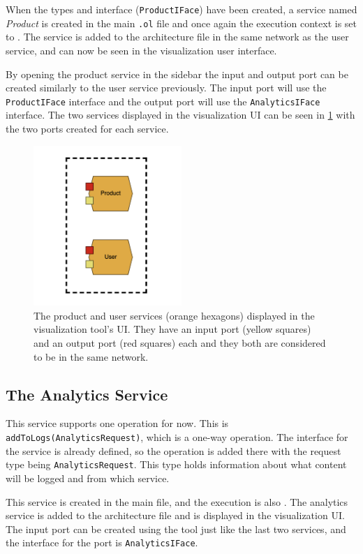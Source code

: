 When the types and interface (\texttt{ProductIFace}) have been created,
a service named \emph{Product} is created in the main \texttt{.ol} file and once again the execution context is set to .
The service is added to the architecture file in the same network as the user service, and can now be seen in the visualization user interface.

By opening the product service in the sidebar the input and output port can be created similarly to the user service previously. The input port will use the \texttt{ProductIFace} interface and the output port will use the \texttt{AnalyticsIFace} interface.
The two services displayed in the visualization UI can be seen in \cref{figure:jv_product_and_user} with the two ports created for each service.
\begin{figure}[t]
    \center
    \includegraphics[width=0.5\textwidth]{figures/jv_product_and_user.png}
    \caption{The product and user services (orange hexagons) displayed in the visualization tool's UI. They have an input port (yellow squares) and an output port (red squares) each and they both are considered to be in the same network.}
    \label{figure:jv_product_and_user}
\end{figure}

\subsection{The Analytics Service}
This service supports one operation for now. This is \texttt{addToLogs(AnalyticsRequest)}, which is a one-way operation. The interface for the service is already defined, so the operation is added there with the request type being \texttt{AnalyticsRequest}. This type holds information about what content will be logged and from which service.

This service is created in the main file, and the execution is also . The analytics service is added to the architecture file and is displayed in the visualization UI.
The input port can be created using the tool just like the last two services, and the interface for the
port is \texttt{AnalyticsIFace}.

